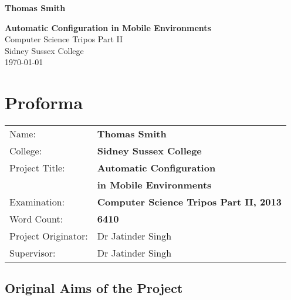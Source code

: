 \documentclass[12pt,twoside,notitlepage]{report}
\begin{document}





\pagestyle{empty}

\hfill{\LARGE \bf Thomas Smith}

\vspace*{60mm}
\begin{center}
\Huge
{\bf Automatic Configuration in Mobile Environments} \\
\vspace*{5mm}
Computer Science Tripos Part II \\
\vspace*{5mm}
Sidney Sussex College \\
\vspace*{5mm}
\today  %
\end{center}

\cleardoublepage


\setcounter{page}{1}
\pagestyle{plain}

\chapter*{Proforma}

{\large
\begin{tabular}{ll}
Name:               & \bf Thomas Smith	\\
College:            & \bf Sidney Sussex College	\\
Project Title:      & \bf Automatic Configuration \\ &\bf in Mobile Environments	\\
Examination:        & \bf Computer Science Tripos Part II, 2013 	\\
Word Count:         & \bf 6410\footnotemark[1] \\
Project Originator: & Dr Jatinder Singh		\\
Supervisor:         & Dr Jatinder Singh		\\ 
\end{tabular}
}



\section*{Original Aims of the Project}
\end{document}
